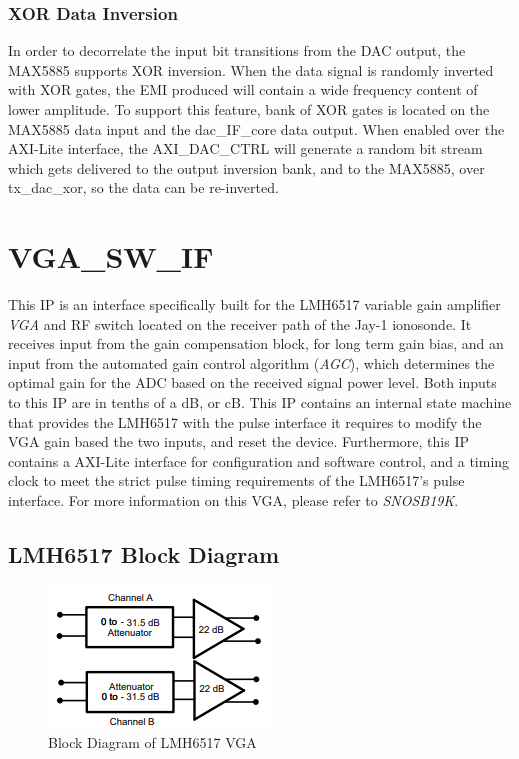 \documentclass[11pt]{article}
\begin{document}
\subsubsection{XOR Data Inversion}
In order to decorrelate the input bit transitions from the DAC output, the MAX5885 supports XOR inversion. When the data signal is randomly inverted with
XOR gates, the EMI produced will contain a wide frequency content of lower amplitude. To support this feature, bank of XOR gates is located on the MAX5885
data input and the dac\_IF\_core data output. When enabled over the AXI-Lite interface, the AXI\_DAC\_CTRL will generate a random bit stream which gets
delivered to the output inversion bank, and to the MAX5885, over tx\_dac\_xor, so the data can be re-inverted.

\section{VGA\_SW\_IF}
This IP is an interface specifically built for the LMH6517 variable gain amplifier \textit{VGA} and RF switch located on the receiver path of the Jay-1
ionosonde. It receives input from the gain compensation block, for long term gain bias, and an input from the automated gain control algorithm
(\textit{AGC}), which determines the optimal gain for the ADC based on the received signal power level. Both inputs to this IP are in tenths of a dB, or
cB. This IP contains an internal state machine that provides the LMH6517 with the pulse interface it requires to modify the VGA gain based the two inputs,
and reset the device. Furthermore, this IP contains a AXI-Lite interface for configuration and software control, and a timing clock to meet the strict
pulse timing requirements of the LMH6517's pulse interface. For more information on this VGA, please refer to \textit{SNOSB19K}.
\subsection{LMH6517 Block Diagram}
\begin{figure}[H]
	\centering
	\includegraphics[width=0.35\linewidth]{images/vga_blockDiagram}
	\caption{Block Diagram of LMH6517 VGA}
\end{figure}
\end{document}
